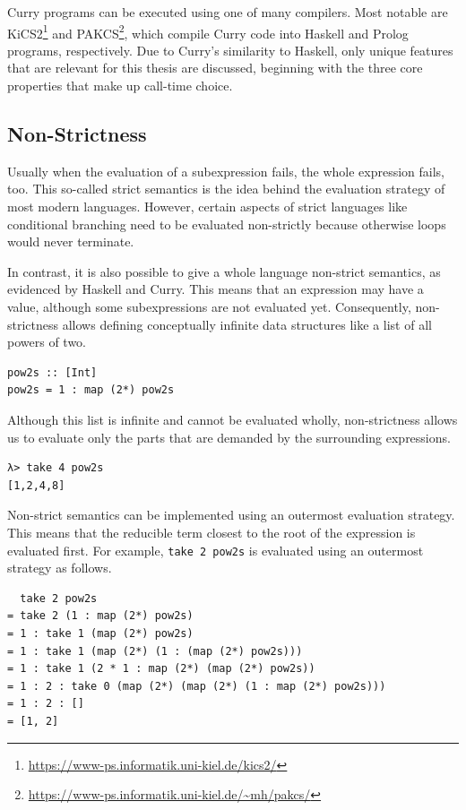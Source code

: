 \documentclass[a4paper, 11pt, fleqn, twoside]{scrreprt}
\newcommand{\hinl}[1]{\texttt{#1}}
\begin{document}
Curry programs can be executed using one of many compilers.
Most notable are KiCS2\footnote{\url{https://www-ps.informatik.uni-kiel.de/kics2/}} and PAKCS\footnote{\url{https://www-ps.informatik.uni-kiel.de/~mh/pakcs/}}, which compile Curry code into Haskell and Prolog programs, respectively.
Due to Curry's similarity to Haskell, only unique features that are relevant for this thesis are discussed, beginning with the three core properties that make up call-time choice.

\subsection{Non-Strictness}
Usually when the evaluation of a subexpression fails, the whole expression fails, too.
This so-called strict semantics is the idea behind the evaluation strategy of most modern languages.
However, certain aspects of strict languages like conditional branching need to be evaluated non-strictly because otherwise loops would never terminate.

In contrast, it is also possible to give a whole language non-strict semantics, as evidenced by Haskell and Curry.
This means that an expression may have a value, although some subexpressions are not evaluated yet.
Consequently, non-strictness allows defining conceptually infinite data structures like a list of all powers of two.

\begin{verbatim}
pow2s :: [Int]
pow2s = 1 : map (2*) pow2s
\end{verbatim}

Although this list is infinite and cannot be evaluated wholly, non-strictness allows us to evaluate only the parts that are demanded by the surrounding expressions.

\begin{verbatim}
λ> take 4 pow2s
[1,2,4,8]
\end{verbatim}

Non-strict semantics can be implemented using an outermost evaluation strategy.
This means that the reducible term closest to the root of the expression is evaluated first.
For example, \hinl{take 2 pow2s} is evaluated using an outermost strategy as follows.

\begin{verbatim}
  take 2 pow2s
= take 2 (1 : map (2*) pow2s)
= 1 : take 1 (map (2*) pow2s)
= 1 : take 1 (map (2*) (1 : (map (2*) pow2s)))
= 1 : take 1 (2 * 1 : map (2*) (map (2*) pow2s))
= 1 : 2 : take 0 (map (2*) (map (2*) (1 : map (2*) pow2s)))
= 1 : 2 : []
= [1, 2]
\end{verbatim}
\end{document}
